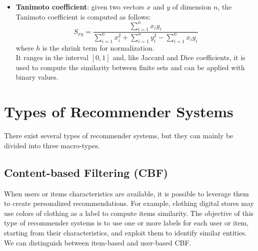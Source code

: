 \begin{itemize}
\item \textbf{Tanimoto coefficient}: given two vectors $x$ and $y$ of dimension $n$, the Tanimoto coefficient is computed as follows:
\[ S_{xy} = \frac{\sum_{i = 1}^{n} x_iy_i}{\sum_{i = 1}^{n} x_i^2 + \sum_{i = 1}^{n} y_i^2 - \sum_{i = 1}^{n} x_iy_i} \]
where $h$ is the shrink term for normalization.\\
It ranges in the interval $[0, 1]$ and, like Jaccard and Dice coefficients, it is used to compute the similarity between finite sets and can be applied with binary values.

\end{itemize}



\section{Types of Recommender Systems}

There exist several types of recommender systems, but they can mainly be divided into three macro-types.


\subsection{Content-based Filtering (CBF)}

When users or items characteristics are available, it is possible to leverage them to create personalized recommendations. For example, clothing digital stores may use colors of clothing as a label to compute items similarity. The objective of this type of recommender systems is to use one or more labels for each user or item, starting from their characteristics, and exploit them to identify similar entities. We can distinguish between item-based and user-based CBF.

